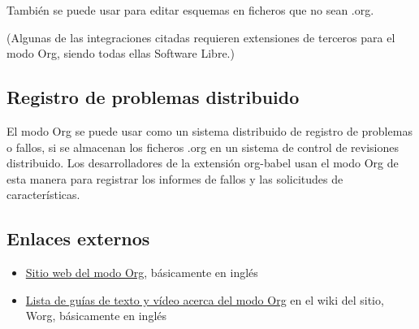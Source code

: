 \documentclass[11pt]{article}
\begin{document}
También se puede usar para editar esquemas en ficheros que no sean .org.

(Algunas de las integraciones citadas requieren extensiones de terceros para el modo Org, siendo todas ellas Software Libre.) 

\subsection{Registro de problemas distribuido}
\label{sec:org55a00e3}
El modo Org se puede usar como un sistema distribuido de registro de problemas o fallos, si se almacenan los ficheros .org en un sistema de control de revisiones distribuido. Los desarrolladores de la extensión org-babel usan el modo Org de esta manera para registrar los informes de fallos y las solicitudes de características.

\subsection{Enlaces externos}
\label{sec:orgd9f0ed4}
\begin{itemize}
\item \href{https://www.orgmode.org/}{Sitio web del modo Org}, básicamente en inglés
\item \href{https://orgmode.org/worg/index.html}{Lista de guías de texto y vídeo acerca del modo Org} en el wiki del sitio, Worg, básicamente en inglés
\end{itemize}
\end{document}
